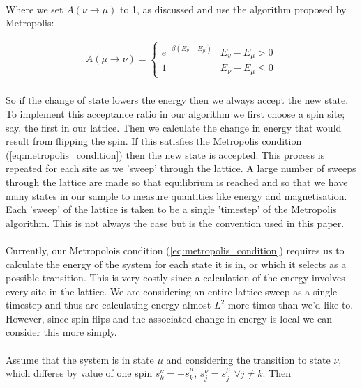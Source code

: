 \documentclass[12pt] {report} %
\begin{document}
				\paragraph{}
					Where we set $A(\nu \rightarrow \mu)$ to 1, as discussed and use the algorithm proposed by Metropolis:
					
				\begin{align}
					A(\mu \rightarrow \nu) =
					\begin{cases}
						e^{-\beta(E_\nu - E_\mu)} 		&E_v - E_\mu > 0 \\			\label{eq:metropolis_condition}
						1 								&E_\nu - E_\mu \leq 0 
					\end{cases}
				\end{align}
				
				\paragraph{}
					So if the change of state lowers the energy then we always accept the new state. To implement this acceptance ratio in our algorithm we first choose a spin site; say, the first in our lattice. Then we calculate the change in energy that would result from flipping the spin. If this satisfies the Metropolis condition (\ref{eq:metropolis_condition}) then the new state is accepted. This process is repeated for each site as we 'sweep' through the lattice. A large number of sweeps through the lattice are made so that equilibrium is reached and so that we have many states in our sample to measure quantities like energy and magnetisation. Each 'sweep' of the lattice is taken to be a single 'timestep' of the Metropolis algorithm. This is not always the case but is the convention used in this paper.
					
				\paragraph{}
					Currently, our Metropolois condition (\ref{eq:metropolis_condition}) requires us to calculate the energy of the system for each state it is in, or which it selects as a possible transition. This is very costly since a calculation of the energy involves every site in the lattice. We are considering an entire lattice sweep as a single timestep and thus are calculating energy almost $L^2$ more times than we'd like to. However, since spin flips and the associated change in energy is local we can consider this more simply.
					
				\paragraph{}
					Assume that the system is in state $\mu$ and considering the transition to state $\nu$, which differes by value of one spin $s_k^\nu = -s_k^\mu$, $s_j^\nu = s_j^\mu$ $\forall j \neq k$. Then
					
\end{document}
